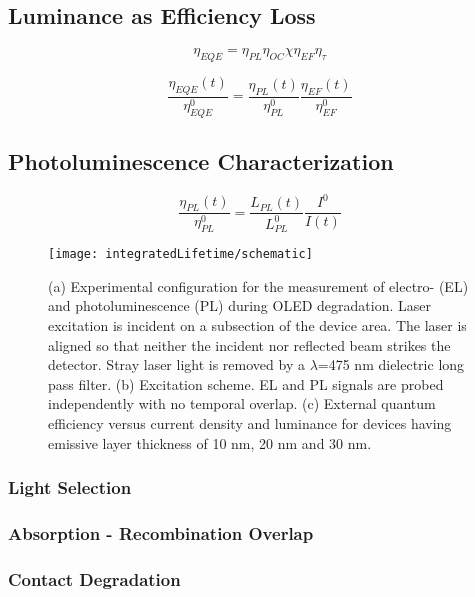 \documentclass[../thesis.tex]{subfiles}
\begin{document}
\subsection{Luminance as Efficiency Loss}
\begin{equation}
\eta_{EQE}=\eta_{PL}\eta_{OC}\chi\eta_{EF}\eta_\tau
\label{eqn:eqe_quenching}
\end{equation}

\begin{equation}
\frac{\eta_{EQE}(t)}{\eta_{EQE}^0}=\frac{\eta_{PL}(t)}{\eta_{PL}^0}\frac{\eta_{EF}(t)}{\eta_{EF}^0}
\label{eqn_eqe_decay_components}
\end{equation}

\subsection{Photoluminescence Characterization}

\begin{equation}
\frac{\eta_{PL}(t)}{\eta_{PL}^0}=\frac{L_{PL}(t)}{L_{PL}^0}\frac{I^0}{I(t)}
\label{eqn:pl_decay}
\end{equation}

\begin{figure}[h]
\centering
\texttt{[image: integratedLifetime/schematic]}
\caption{(a) Experimental configuration for the measurement of electro- (EL) and photoluminescence (PL) during OLED degradation.  Laser excitation is incident on a subsection of the device area.  The laser is aligned so that neither the incident nor reflected beam strikes the detector.  Stray laser light is removed by a $\lambda$=475 nm dielectric long pass filter.  (b) Excitation scheme.  EL and PL signals are probed independently with no temporal overlap.  (c) External quantum efficiency versus current density and luminance for devices having emissive layer thickness of 10 nm, 20 nm and 30 nm.}
\label{fig:schematic}
\end{figure}
\subsubsection{Light Selection}
\subsubsection{Absorption - Recombination Overlap}
\subsubsection{Contact Degradation}
\end{document}
